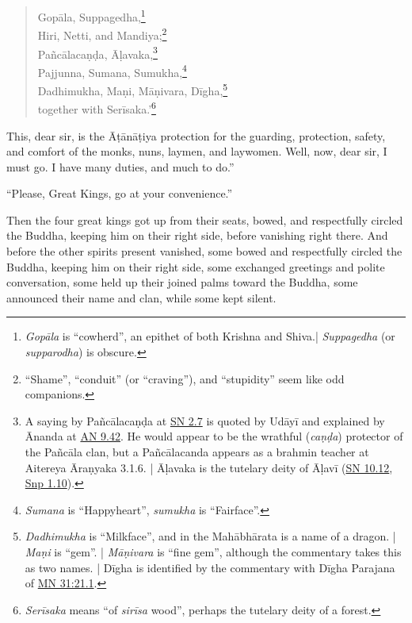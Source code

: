\documentclass[12pt,openany]{book}%
\begin{document}
\begin{verse}
\textsanskrit{Gopāla}, Suppagedha,\footnote{\textit{\textsanskrit{Gopāla}} is “cowherd”, an epithet of both Krishna and Shiva.|  \textit{Suppagedha} (or \textit{supparodha}) is obscure. } \\
Hiri, Netti, and Mandiya;\footnote{“Shame”, “conduit” (or “craving”), and “stupidity” seem like odd companions. } \\
\textsanskrit{Pañcālacaṇḍa}, \textsanskrit{Āḷavaka},\footnote{A saying by \textsanskrit{Pañcālacaṇḍa} at \href{https://suttacentral.net/sn2.7/en/sujato}{SN 2.7} is quoted by \textsanskrit{Udāyī} and explained by Ānanda at \href{https://suttacentral.net/an9.42/en/sujato}{AN 9.42}. He would appear to be the wrathful (\textit{\textsanskrit{caṇḍa}}) protector of the \textsanskrit{Pañcāla} clan, but a \textsanskrit{Pañcālacanda} appears as a brahmin teacher at Aitereya \textsanskrit{Āraṇyaka} 3.1.6. | \textsanskrit{Āḷavaka} is the tutelary deity of \textsanskrit{Āḷavī} (\href{https://suttacentral.net/sn10.12/en/sujato}{SN 10.12}, \href{https://suttacentral.net/snp1.10/en/sujato}{Snp 1.10}). } \\
Pajjunna, Sumana, Sumukha,\footnote{\textit{Sumana} is “Happyheart”, \textit{sumukha} is “Fairface”. } \\
Dadhimukha, \textsanskrit{Maṇi}, \textsanskrit{Māṇivara}, \textsanskrit{Dīgha},\footnote{\textit{Dadhimukha} is “Milkface”, and in the \textsanskrit{Mahābhārata} is a name of a dragon. | \textit{\textsanskrit{Maṇi}} is “gem”. | \textit{\textsanskrit{Māṇivara}} is “fine gem”, although the commentary takes this as two names. | \textsanskrit{Dīgha} is identified by the commentary with \textsanskrit{Dīgha} Parajana of \href{https://suttacentral.net/mn31/en/sujato\#21.1}{MN 31:21.1}. } \\
together with \textsanskrit{Serīsaka}.’\footnote{\textit{\textsanskrit{Serīsaka}} means “of \textit{\textsanskrit{sirīsa}} wood”, perhaps the tutelary deity of a forest. } 

%
\end{verse}

This, dear sir, is the \textsanskrit{Āṭānāṭiya} protection for the guarding, protection, safety, and comfort of the monks, nuns, laymen, and laywomen. Well, now, dear sir, I must go. I have many duties, and much to do.” 

“Please, Great Kings, go at your convenience.” 

Then the four great kings got up from their seats, bowed, and respectfully circled the Buddha, keeping him on their right side, before vanishing right there. And before the other spirits present vanished, some bowed and respectfully circled the Buddha, keeping him on their right side, some exchanged greetings and polite conversation, some held up their joined palms toward the Buddha, some announced their name and clan, while some kept silent. 
\end{document}
